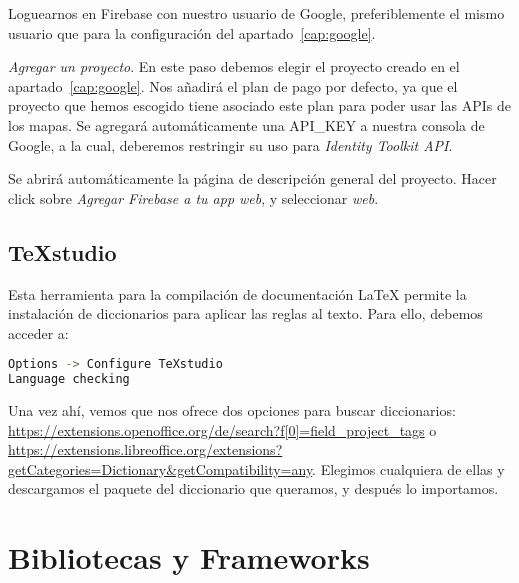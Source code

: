 \begin{steps}
	\item Loguearnos en Firebase con nuestro usuario de Google, preferiblemente el mismo usuario que para la configuración del apartado~\ref{cap:google}.
	\item \textit{Agregar un proyecto}. En este paso debemos elegir el proyecto creado en el apartado~\ref{cap:google}. Nos añadirá el plan de pago por defecto, ya que el proyecto que hemos escogido tiene asociado este plan para poder usar las APIs de los mapas. Se agregará automáticamente una API\_KEY a nuestra consola de Google, a la cual, deberemos restringir su uso para \textit{Identity Toolkit API}.
	\item Se abrirá automáticamente la página de descripción general del proyecto. Hacer click sobre \textit{Agregar Firebase a tu app web}, y seleccionar \textit{web}.
\end{steps}


  
\subsection{\TeX studio}
Esta herramienta para la compilación de documentación \LaTeX{} permite la instalación de diccionarios para aplicar las reglas al texto. Para ello, debemos acceder a:

\renewcommand{\lstlistingname}{Configure \TeX studio}%
\renewcommand{\lstlistlistingname}{List of \lstlistingname s}
\begin{lstlisting}[language=bash,caption={Añadir diccionario}]
Options -> Configure TeXstudio
Language checking
\end{lstlisting}

Una vez ahí, vemos que nos ofrece dos opciones para buscar diccionarios: \url{https://extensions.openoffice.org/de/search?f[0]=field_project_tags} o \url{https://extensions.libreoffice.org/extensions?getCategories=Dictionary&getCompatibility=any}. Elegimos cualquiera de ellas y descargamos el paquete del diccionario que queramos, y después lo importamos.


\section{Bibliotecas y Frameworks}

